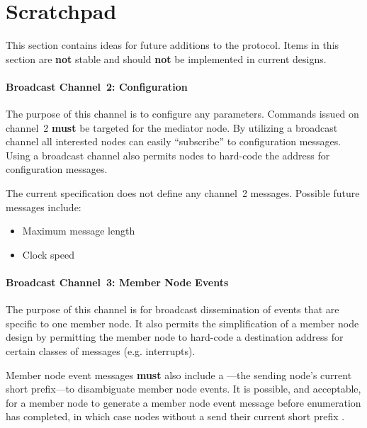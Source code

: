 \section{Scratchpad}
This section contains ideas for future additions to the \bus protocol. Items
in this section are {\bf not} stable and should {\bf not} be implemented in
current \bus designs.


\paragraph{Broadcast Channel~2: \bus Configuration}
\label{scratch:sec:channel-2}

The purpose of this channel is to configure any \bus parameters. Commands
issued on channel~2 {\bf must} be targeted for the mediator node. By utilizing
a broadcast channel all interested nodes can easily ``subscribe'' to
configuration messages. Using a broadcast channel also permits nodes to
hard-code the address for configuration messages.

The current \bus specification does not define any channel~2 messages.
Possible future messages include:
\begin{itemize}
  \item Maximum message length
  \item Clock speed
\end{itemize}

\paragraph{Broadcast Channel~3: Member Node Events}
\label{scratch:sec:channel-3}

The purpose of this channel is for broadcast dissemination of events that are
specific to one member node.  It also permits the simplification of a member
node design by permitting the member node to hard-code a destination address
for certain classes of messages (e.g. interrupts).

Member node event messages {\bf must} also include a ---the sending node's current short prefix---to disambiguate
member node events. It is possible, and acceptable, for a member node to
generate a member node event message before enumeration has completed, in
which case nodes without a  send
their current short prefix .


